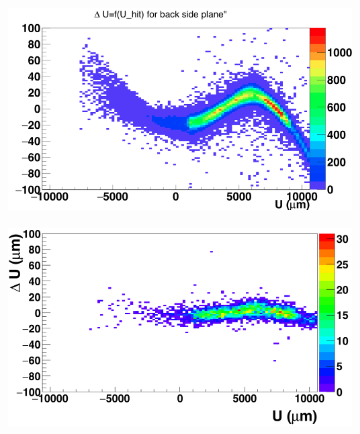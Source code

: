    \begin{figure}[!h]
    \centering
    \begin{subfigure}[t]{0.45\textwidth}
    \centering
      \includegraphics[width = \textwidth]{Pictures/deformation/deltaUU_6_deformed.png}
      \caption{}
      \label{fig:scatterDUU_deformed_back}
    \end{subfigure}
    \hfill
    \begin{subfigure}[t]{0.45\textwidth}
      \centering
      \includegraphics[width = \textwidth]{Pictures/deformation/deltaUU_6_corrected1.png}
      \caption{}
      \label{fig:scatterDUU_corrected_back}
    \end{subfigure}


\end{figure}
